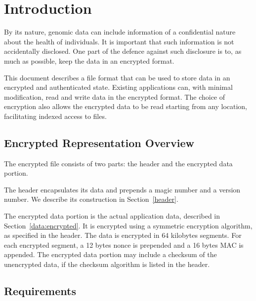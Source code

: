 \section{Introduction}

By its nature, genomic data can include information of a confidential nature about the health of individuals.
%
It is important that such information is not accidentally disclosed.
%
One part of the defence against such disclosure is to, as much as possible, keep the data in an encrypted format.
%

This document describes a file format that can be used to store data in an encrypted and authenticated state.
%
Existing applications can, with minimal modification, read and write data in the encrypted format.
%
The choice of encryption also allows the encrypted data to be read starting from any location, facilitating indexed access to files.

\subsection{Encrypted Representation Overview}

The encrypted file consists of two parts: the header and the encrypted data portion.

The header encapsulates its data and prepends a magic number and a version number.
%
We describe its construction in Section~\ref{header}.

The encrypted data portion is the actual application data, described in Section~\ref{data:encrypted}.
% 
It is encrypted using a symmetric encryption algorithm, as specified in the header.
% 
The data is encrypted in 64 kilobytes segments. For each encrypted segment, a 12 bytes nonce is prepended and a 16 bytes MAC is appended.
% 
The encrypted data portion may include a checksum of the unencrypted data, if the checksum algorithm is listed in the header.


\subsection{Requirements}

